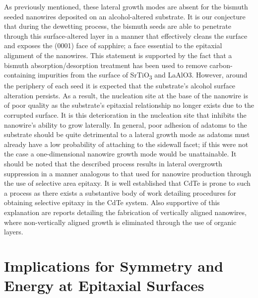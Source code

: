 As previously mentioned, these lateral growth modes are
absent for the bismuth seeded nanowires deposited on an
alcohol-altered substrate. It is our conjecture that during the
dewetting process, the bismuth seeds are able to penetrate
through this surface-altered layer in a manner that effectively
cleans the surface and exposes the (0001) face of sapphire;
a face essential to the epitaxial alignment of the nanowires.
This statement is supported by the fact that a bismuth
absorption/desorption treatment has been used to remove
carbon-containing impurities from the surface of SrTiO\textsubscript{3} and
LaAlO3\cite{Watanabe1991a}. However, around the periphery of each seed it is
expected that the substrate's alcohol surface alteration persists.
As a result, the nucleation site at the base of the nanowire is of
poor quality as the substrate's epitaxial relationship no longer
exists due to the corrupted surface. It is this deterioration
in the nucleation site that inhibits the nanowire's ability to
grow laterally. In general, poor adhesion of adatoms to the
substrate should be quite detrimental to a lateral growth mode
as adatoms must already have a low probability of attaching to
the sidewall facet; if this were not the case a one-dimensional
nanowire growth mode would be unattainable. It should be
noted that the described process results in lateral overgrowth
suppression in a manner analogous to that used for nanowire
production through the use of selective area epitaxy. It is well
established that CdTe is prone to such a process as there exists
a substantive body of work detailing procedures for obtaining
selective epitaxy in the CdTe system\cite{Sporken2000,Zhang2001a,Bhat2006a}. Also supportive
of this explanation are reports detailing the fabrication of
vertically aligned nanowires, where non-vertically aligned
growth is eliminated through the use of organic layers\cite{Krishnamachari2004,Mikkelsen2005,Martensson2007}.

\section{Implications for Symmetry and Energy at Epitaxial Surfaces}
